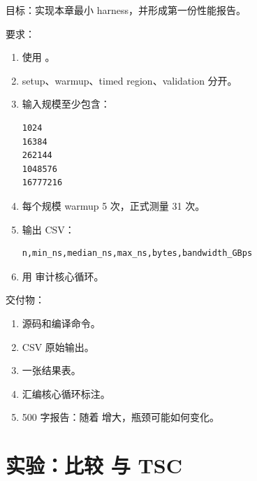 \begin{labbox}
目标：实现本章最小 harness，并形成第一份性能报告。

要求：

\begin{enumerate}
  \item 使用 。
  \item setup、warmup、timed region、validation 分开。
  \item 输入规模至少包含：
\begin{lstlisting}
1024
16384
262144
1048576
16777216
\end{lstlisting}
  \item 每个规模 warmup 5 次，正式测量 31 次。
  \item 输出 CSV：
\begin{lstlisting}
n,min_ns,median_ns,max_ns,bytes,bandwidth_GBps
\end{lstlisting}
  \item 用  审计核心循环。
\end{enumerate}

交付物：

\begin{enumerate}
  \item 源码和编译命令。
  \item CSV 原始输出。
  \item 一张结果表。
  \item 汇编核心循环标注。
  \item 500 字报告：随着  增大，瓶颈可能如何变化。
\end{enumerate}
\end{labbox}

\section{实验：比较  与 TSC}

